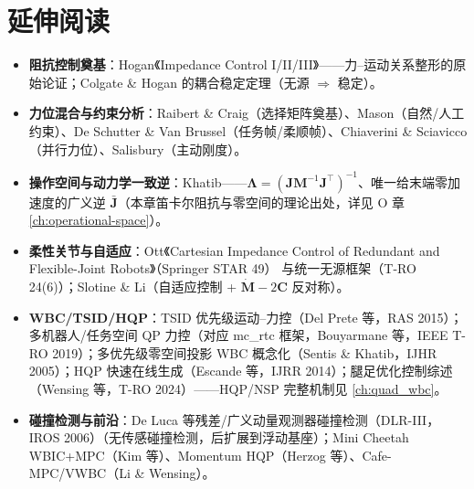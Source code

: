 \section*{延伸阅读}
\begin{itemize}
  \item \textbf{阻抗控制奠基}：Hogan《Impedance Control I/II/III》\cite{hogan1985impedance}——力--运动关系整形的原始论证；Colgate \& Hogan\cite{colgate1988robust} 的耦合稳定定理（无源 $\Rightarrow$ 稳定）。
  \item \textbf{力位混合与约束分析}：Raibert \& Craig\cite{raibert1981hybrid}（选择矩阵奠基）、Mason\cite{mason1981compliance}（自然/人工约束）、De Schutter \& Van Brussel\cite{deschutter1988compliant}（任务帧/柔顺帧）、Chiaverini \& Sciavicco\cite{chiaverini1993parallel}（并行力位）、Salisbury\cite{salisbury1980active}（主动刚度）。
  \item \textbf{操作空间与动力学一致逆}：Khatib\cite{khatib1987operational}——$\boldsymbol{\Lambda}=(\mathbf{J}\mathbf{M}^{-1}\mathbf{J}^\top)^{-1}$、唯一给末端零加速度的广义逆 $\bar{\mathbf{J}}$（本章笛卡尔阻抗与零空间的理论出处，详见 O 章 \cref{ch:operational-space}）。
  \item \textbf{柔性关节与自适应}：Ott《Cartesian Impedance Control of Redundant and Flexible-Joint Robots》（Springer STAR 49）\cite{ott2008cartesian} 与统一无源框架（T-RO 24(6)）\cite{ott2008unified}；Slotine \& Li\cite{slotine1987adaptive}（自适应控制 + $\dot{\mathbf{M}}-2\mathbf{C}$ 反对称）。
  \item \textbf{WBC/TSID/HQP}：TSID 优先级运动--力控（Del Prete 等，RAS 2015）\cite{delprete2015tsid}；多机器人/任务空间 QP 力控（对应 mc\_rtc 框架，Bouyarmane 等，IEEE T-RO 2019）\cite{bouyarmane2019qp}；多优先级零空间投影 WBC 概念化（Sentis \& Khatib，IJHR 2005）\cite{sentis2005synthesis}；HQP 快速在线生成（Escande 等，IJRR 2014）\cite{escande2014hierarchical}；腿足优化控制综述（Wensing 等，T-RO 2024）\cite{wensing2024legged}——HQP/NSP 完整机制见 \cref{ch:quad_wbc}。
  \item \textbf{碰撞检测与前沿}：De Luca 等残差/广义动量观测器碰撞检测（DLR-III，IROS 2006）\cite{deluca2006collision}（无传感碰撞检测，后扩展到浮动基座）；Mini Cheetah WBIC+MPC（Kim 等）\cite{kim2019wbic}、Momentum HQP（Herzog 等）\cite{herzog2016momentum}、Cafe-MPC/VWBC（Li \& Wensing）\cite{li2024cafempc}。
\end{itemize}

